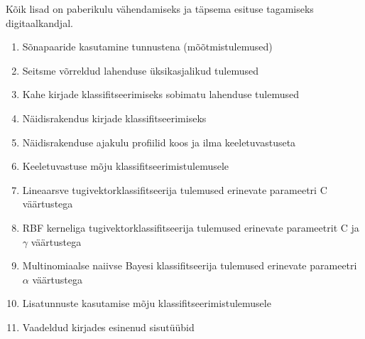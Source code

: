 \documentclass[]{trkuur}
\begin{document}
Kõik lisad on paberikulu vähendamiseks ja täpsema esituse tagamiseks digitaalkandjal.
\begin{enumerate}
\item Sõnapaaride kasutamine tunnustena (mõõtmistulemused)
\item Seitsme võrreldud lahenduse üksikasjalikud tulemused
\item Kahe kirjade klassifitseerimiseks sobimatu lahenduse tulemused
\item Näidisrakendus kirjade klassifitseerimiseks
\item Näidisrakenduse ajakulu profiilid koos ja ilma keeletuvastuseta
\item Keeletuvastuse mõju klassifitseerimistulemusele
\item Lineaarsve tugivektorklassifitseerija tulemused erinevate parameetri C väärtustega
\item RBF kerneliga tugivektorklassifitseerija tulemused erinevate parameetrit C ja \(\gamma\) väärtustega
\item Multinomiaalse naiivse Bayesi klassifitseerija tulemused erinevate parameetri \(\alpha\) väärtustega
\item Lisatunnuste kasutamise mõju klassifitseerimistulemusele
\item Vaadeldud kirjades esinenud sisutüübid
\end{enumerate}
\end{document}
